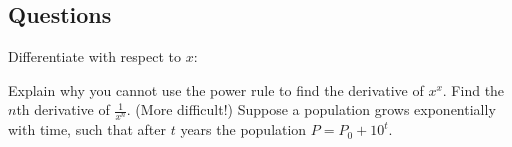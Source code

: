 \clearpage
\subsection*{Questions}
\begin{questions}
  \question Differentiate with respect to $ x $:
  \question Explain why you cannot use the power rule to find the derivative of $ x^x $.
  \question Find the $ n$th derivative of $ \frac{1}{x^n} $.
  \question (More difficult!) Suppose a population grows exponentially with time, such that after $ t $ years the population $ P = P_0 + 10^t $.
\end{questions}


